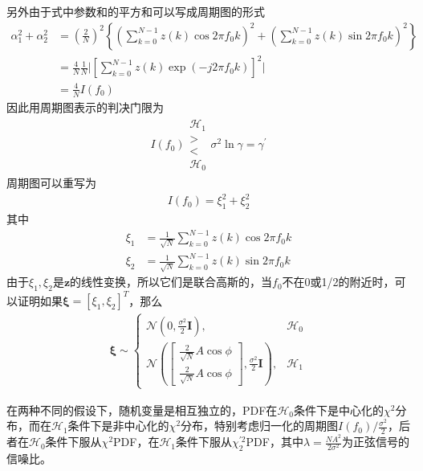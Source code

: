 \documentclass[fontset=windows]{article}
\numberwithin{figure}{section}
\begin{document}
另外由于式中参数和的平方和可以写成周期图的形式
\begin{align*}
	\alpha^2_1+\alpha^2_2
	 & =(\frac{2}{N})^2\left\{(\sum_{k=0}^{N-1}z(k)\cos 2\pi f_0 k)^2 +(\sum_{k=0}^{N-1}z(k)\sin 2\pi f_0 k)^2\right\} \\
	 & =\frac{4}{N}\frac{1}{N}\Bigg| \left[\sum_{k=0}^{N-1}z(k)\exp(-j2\pi f_0k)\right]^2\Bigg|                        \\
	 & =\frac{4}{N}I(f_0)
\end{align*}
因此用周期图表示的判决门限为
\begin{align*}
	I(f_0)\begin{matrix}
		      \mathcal{H}_1 \\>\\<\\\mathcal{H}_0
	      \end{matrix}
	\sigma^2\ln \gamma=\gamma^{\prime}
\end{align*}
周期图可以重写为
\begin{align*}
	I(f_0)=\xi_1^2+\xi_2^2
\end{align*}
其中
\begin{align*}
	\xi_1 & =\frac{1}{\sqrt{N}}\sum_{k=0}^{N-1}z(k)\cos 2\pi f_0 k \\
	\xi_2 & =\frac{1}{\sqrt{N}}\sum_{k=0}^{N-1}z(k)\sin 2\pi f_0 k
\end{align*}
由于\(\xi_1,\xi_2\)是\(\mathbf{z}\)的线性变换，所以它们是联合高斯的，当\(f_0\)不在0或1/2的附近时，可以证明如果\(\boldsymbol{\xi}=[\xi_1,\xi_2]^T\)，那么
\begin{align*}
	\boldsymbol{\xi}\sim\left\{
	\begin{matrix}
		\mathcal{N}(0,\frac{\sigma^2}{2}\mathbf{I}),                                                                                                                                 & \mathcal{H}_0 \\
		\mathcal{N}\left(\begin{bmatrix}\frac{2}{\sqrt{N}}A\cos \phi\\\frac{2}{\sqrt{N}}A\cos \phi\end{bmatrix},\frac{\sigma^2}{2}\mathbf{I}\right), & \mathcal{H}_1
	\end{matrix}
	\right.
\end{align*}

在两种不同的假设下，随机变量是相互独立的，PDF在\(\mathcal{H}_0\)条件下是中心化的\(\chi ^2\)分布，而在\(\mathcal{H}_1\)条件下是非中心化的\(\chi^2\)分布，特别考虑归一化的周期图\(I(f_0)/\frac{\sigma^2}{2}\)，后者在\(\mathcal{H}_0\)条件下服从\(\chi^2\)PDF，在\(\mathcal{H}_1\)条件下服从\(\chi^{\prime2}_2\)PDF，其中\(\lambda=\frac{NA^2}{2\sigma^2}\)为正弦信号的信噪比。
\end{document}
